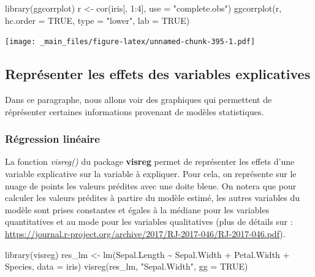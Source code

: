 \documentclass[
]{book}
\newenvironment{Shaded}{\begin{snugshade}}{\end{snugshade}}
\newcommand{\AttributeTok}[1]{\textcolor[rgb]{0.77,0.63,0.00}{#1}}
\newcommand{\ConstantTok}[1]{\textcolor[rgb]{0.00,0.00,0.00}{#1}}
\newcommand{\DecValTok}[1]{\textcolor[rgb]{0.00,0.00,0.81}{#1}}
\newcommand{\FunctionTok}[1]{\textcolor[rgb]{0.00,0.00,0.00}{#1}}
\newcommand{\NormalTok}[1]{#1}
\newcommand{\OtherTok}[1]{\textcolor[rgb]{0.56,0.35,0.01}{#1}}
\newcommand{\SpecialCharTok}[1]{\textcolor[rgb]{0.00,0.00,0.00}{#1}}
\newcommand{\StringTok}[1]{\textcolor[rgb]{0.31,0.60,0.02}{#1}}
\theoremstyle{definition}
\theoremstyle{definition}
\theoremstyle{definition}
\theoremstyle{definition}
\theoremstyle{remark}
\begin{document}
\begin{Shaded}
\begin{Highlighting}[]
\FunctionTok{library}\NormalTok{(ggcorrplot)}
\NormalTok{r }\OtherTok{\textless{}{-}} \FunctionTok{cor}\NormalTok{(iris[, }\DecValTok{1}\SpecialCharTok{:}\DecValTok{4}\NormalTok{], }\AttributeTok{use =} \StringTok{"complete.obs"}\NormalTok{)}
\FunctionTok{ggcorrplot}\NormalTok{(r, }
           \AttributeTok{hc.order =} \ConstantTok{TRUE}\NormalTok{, }
           \AttributeTok{type =} \StringTok{"lower"}\NormalTok{,}
           \AttributeTok{lab =} \ConstantTok{TRUE}\NormalTok{)}
\end{Highlighting}
\end{Shaded}

\texttt{[image: \_main\_files/figure-latex/unnamed-chunk-395-1.pdf]}

\hypertarget{repruxe9senter-les-effets-des-variables-explicatives}{%
\subsection{Représenter les effets des variables explicatives}\label{repruxe9senter-les-effets-des-variables-explicatives}}

Dans ce paragraphe, nous allons voir des graphiques qui permettent de réprésenter certaines informations provenant de modèles statistiques.

\hypertarget{ruxe9gression-linuxe9aire}{%
\subsubsection{Régression linéaire}\label{ruxe9gression-linuxe9aire}}

La fonction \emph{visreg()} du package \textbf{visreg} permet de représenter les effets d'une variable explicative sur la variable à expliquer. Pour cela, on représente sur le nuage de points les valeurs prédites avec une doite bleue. On notera que pour calculer les valeurs prédites à partire du modèle estimé, les autres variables du modèle sont prises constantes et égales à la médiane pour les variables quantitatives et au mode pour les variables qualitatives (plus de détails sur : \url{https://journal.r-project.org/archive/2017/RJ-2017-046/RJ-2017-046.pdf}).

\begin{Shaded}
\begin{Highlighting}[]
\FunctionTok{library}\NormalTok{(visreg)}
\NormalTok{res\_lm }\OtherTok{\textless{}{-}} \FunctionTok{lm}\NormalTok{(Sepal.Length }\SpecialCharTok{\textasciitilde{}} 
\NormalTok{ Sepal.Width }\SpecialCharTok{+}\NormalTok{ Petal.Width }\SpecialCharTok{+}\NormalTok{ Species,}
 \AttributeTok{data =}\NormalTok{ iris)}
\FunctionTok{visreg}\NormalTok{(res\_lm, }\StringTok{"Sepal.Width"}\NormalTok{,}
       \AttributeTok{gg =} \ConstantTok{TRUE}\NormalTok{) }
\end{Highlighting}
\end{Shaded}
\end{document}
